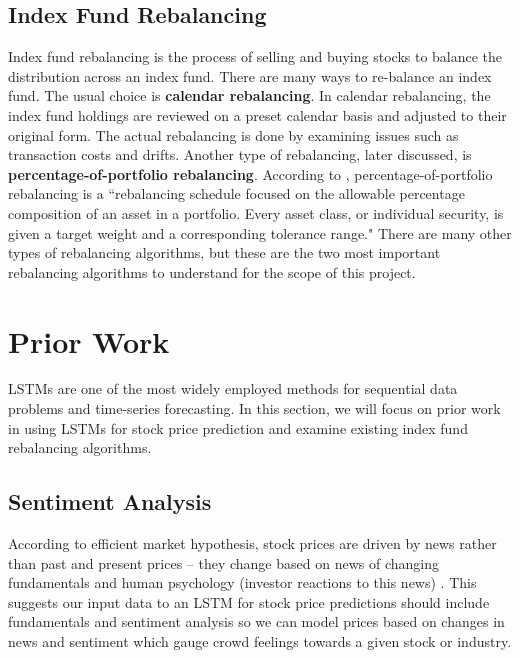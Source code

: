 \documentclass[10pt,twocolumn]{article}
\begin{document}
\subsection{Index Fund Rebalancing}

Index fund rebalancing is the process of selling and buying stocks to balance the distribution across an index fund. There are many ways to re-balance an index fund. The usual choice is \textbf{calendar rebalancing}. In calendar rebalancing, the index fund holdings are reviewed on a preset calendar basis and adjusted to their original form. The actual rebalancing is done by examining issues such as transaction costs and drifts. Another type of rebalancing, later discussed, is \textbf{percentage-of-portfolio rebalancing}. According to \textcite{TypesOfRebalancingStrategies}, percentage-of-portfolio rebalancing is a ``rebalancing schedule focused on the allowable percentage composition of an asset in a portfolio. Every asset class, or individual security, is given a target weight and a corresponding tolerance range." There are many other types of rebalancing algorithms, but these are the two most important rebalancing algorithms to understand for the scope of this project.

\section{Prior Work} \label{priorwork}

LSTMs are one of the most widely employed methods for sequential data problems and time-series forecasting. In this section, we will focus on prior work in using LSTMs for stock price prediction and examine existing index fund rebalancing algorithms.

\subsection{Sentiment Analysis}

According to efficient market hypothesis, stock prices are driven by news rather than past and present prices -- they change based on news of changing fundamentals and human psychology (investor reactions to this news) \cite{LSTMSentimentAnalysis}. This suggests our input data to an LSTM for stock price predictions should include fundamentals and sentiment analysis so we can model prices based on changes in news and sentiment which gauge crowd feelings towards a given stock or industry.
\end{document}
